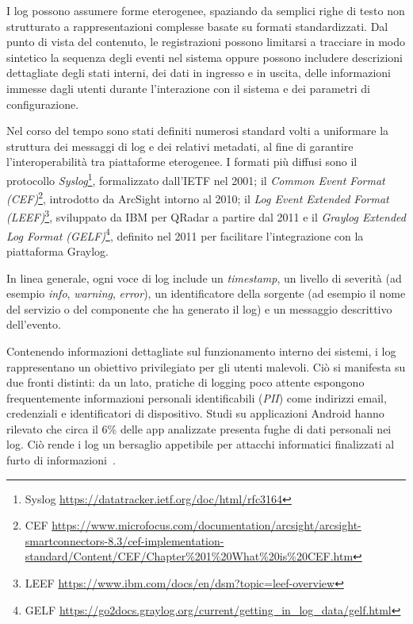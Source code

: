 \documentclass[12pt,twoside]{report}
\begin{document}
I log possono assumere forme eterogenee, spaziando da semplici righe di testo non strutturato a rappresentazioni complesse basate su formati standardizzati. Dal punto di vista del contenuto, le registrazioni possono limitarsi a tracciare in modo sintetico la sequenza degli eventi nel sistema oppure possono includere descrizioni dettagliate degli stati interni, dei dati in ingresso e in uscita, delle informazioni immesse dagli utenti durante l'interazione con il sistema e dei parametri di configurazione.

Nel corso del tempo sono stati definiti numerosi standard volti a uniformare la struttura dei messaggi di log e dei relativi metadati, al fine di garantire l'interoperabilità tra piattaforme eterogenee. I formati più diffusi sono il protocollo \textit{Syslog}\footnote{Syslog \url{https://datatracker.ietf.org/doc/html/rfc3164}}, formalizzato dall'IETF nel 2001; il \textit{Common Event Format (CEF)}\footnote{CEF \url{https://www.microfocus.com/documentation/arcsight/arcsight-smartconnectors-8.3/cef-implementation-standard/Content/CEF/Chapter\%201\%20What\%20is\%20CEF.htm}}, introdotto da ArcSight intorno al 2010; il \textit{Log Event Extended Format (LEEF)}\footnote{LEEF \url{https://www.ibm.com/docs/en/dsm?topic=leef-overview}}, sviluppato da IBM per QRadar a partire dal 2011 e il \textit{Graylog Extended Log Format (GELF)}\footnote{GELF \url{https://go2docs.graylog.org/current/getting_in_log_data/gelf.html}}, definito nel 2011 per facilitare l'integrazione con la piattaforma Graylog.

In linea generale, ogni voce di log include un \textit{timestamp}, un livello di severità (ad esempio \textit{info}, \textit{warning}, \textit{error}), un identificatore della sorgente (ad esempio il nome del servizio o del componente che ha generato il log) e un messaggio descrittivo dell'evento.

Contenendo informazioni dettagliate sul funzionamento interno dei sistemi, i log rappresentano un obiettivo privilegiato per gli utenti malevoli. Ciò si manifesta su due fronti distinti: da un lato, pratiche di logging poco attente espongono frequentemente informazioni personali identificabili (\textit{PII}) come indirizzi email, credenziali e identificatori di dispositivo. Studi su applicazioni Android hanno rilevato che circa il 6\% delle app analizzate presenta fughe di dati personali nei log. Ciò rende i log un bersaglio appetibile per attacchi informatici finalizzati al furto di informazioni~\cite{aghili2024protecting_privacy_logs, hou2025catamaran}.
\end{document}
